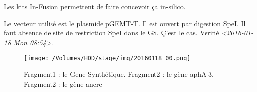 \documentclass[9pt, oneside, twocolumn]{scrartcl}
\begin{document}
Les kits In-Fusion permettent de faire concevoir ça in-silico. 

Le vecteur utilisé est le plasmide pGEMT-T. Il est ouvert par digestion SpeI. Il
faut absence de site de restriction SpeI dans le GS. Ç'est le cas. Vérifié
\textit{<2016-01-18 Mon 08:54>}.


\begin{figure}[htb]
\centering
\texttt{[image: /Volumes/HDD/stage/img/20160118\_00.png]}
\caption{Fragment1 : le Gene Synthétique. Fragment2 : le gène aphA-3. Fragment2 : le gène ancre.}
\end{figure}
\end{document}
